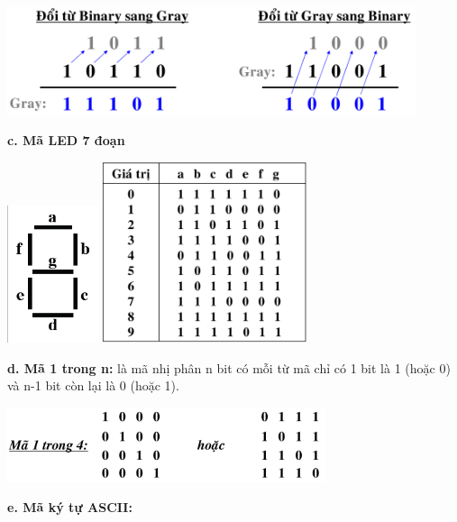 \begin{center}
    \includegraphics[width = 0.9\textwidth]{./local/image/9.png}
\end{center}
\textbf{c. Mã LED 7 đoạn}
\begin{center}
    \includegraphics[width = 0.2\textwidth]{./local/image/16.png} \qquad \qquad \qquad \qquad \includegraphics[width = 0.45\textwidth]{./local/image/17.png}
\end{center}
\textbf{d. Mã 1 trong n:} là mã nhị phân n bit có mỗi từ mã chỉ có 1 bit là 1 (hoặc 0) và n-1 bit còn lại là 0 (hoặc 1).
\begin{center}
    \includegraphics[width = 0.7\textwidth]{./local/image/18.png}
\end{center}
\textbf{e. Mã ký tự ASCII:}
